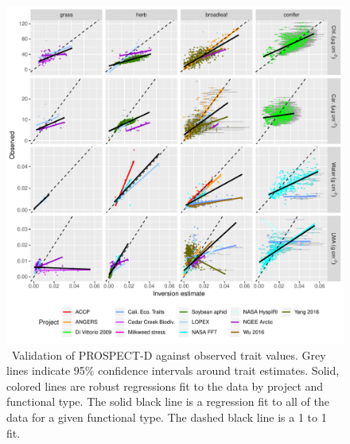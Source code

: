 \begin{figure}
  \centering
  \includegraphics[width=\textwidth]{3_prospect/figures/validation_by_gf.pdf}
  \caption{\
    Validation of PROSPECT-D against observed trait values.
    Grey lines indicate 95\% confidence intervals around trait estimates.
    Solid, colored lines are robust regressions fit to the data by project and functional type.
    The solid black line is a regression fit to all of the data for a given functional type.
    The dashed black line is a 1 to 1 fit.
  }\label{fig:prospect_D_validation}
\end{figure}

